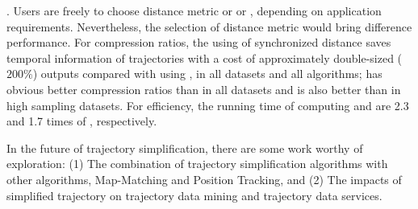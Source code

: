 \emph{}. Users are freely to choose distance metric \sed or \ped or \dad, depending on application requirements. Nevertheless, the selection of distance metric would bring difference performance.
For compression ratios, the using of synchronized distance \sed saves temporal information of trajectories with a cost of approximately double-sized (\ie $200\%$) outputs compared with using \ped, in all datasets and all algorithms; \ped has obvious better compression ratios than \dad in all datasets and \sed is also better than \dad in high sampling datasets.
For efficiency, the running time of computing \ped and \sed are 2.3 and 1.7 times of \dad, respectively.


In the future of trajectory simplification, there are some work worthy of exploration:
(1) The combination of trajectory simplification algorithms with other algorithms, \eg Map-Matching and Position Tracking, and
(2) The impacts of simplified trajectory on trajectory data mining and trajectory data services.

%
%
